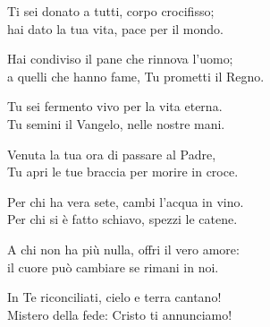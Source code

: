 

\spazio

\strofa Ti sei donato a tutti, corpo crocifisso;\\
hai dato la tua vita, pace per il mondo.

\spazio


\spazio

\strofa Hai condiviso il pane che rinnova l'uomo;\\
a quelli che hanno fame, Tu prometti il Regno.

\spazio


\spazio

\strofa Tu sei fermento vivo per la vita eterna.\\
Tu semini il Vangelo, nelle nostre mani.

\spazio


\spazio

\strofa Venuta la tua ora di passare al Padre,\\
Tu apri le tue braccia per morire in croce.

\spazio


\spazio

\strofa Per chi ha vera sete, cambi l'acqua in vino.\\
Per chi si è fatto schiavo, spezzi le catene.

\spazio


\spazio

\strofa A chi non ha più nulla, offri il vero amore:\\
il cuore può cambiare se rimani in noi.

\spazio


\spazio

\strofa In Te riconciliati, cielo e terra cantano!\\
Mistero della fede: Cristo ti annunciamo!

\spazio

